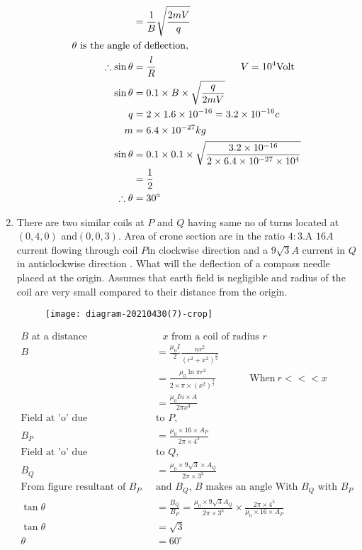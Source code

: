 \begin{enumerate}[ label=\color{ocre}\textbf{\arabic*.}]
\begin{answer}
\begin{align*}
		&=\frac{1}{B}\sqrt{\frac{2mV}{q}}\\
		\text{$ \theta $ is the angle }&\text{of deflection,}\\
		\therefore\sin\theta&=\frac{l}{R}\hspace{3cm}V=10^4\text{Volt}\\
		\sin\theta&=0.1\times B\times\sqrt{\frac{q}{2mV}}\\
		q&=2\times1.6\times10^{-16}=3.2\times10^{-16}c\\
		m&=6.4\times10^{-27}kg\\
		\sin\theta&=0.1\times0.1\times\sqrt{\frac{3.2\times10^{-16}}{2\times6.4\times10^{-27}\times10^4}}\\
		&=\frac{1}{2}\\
		\therefore\theta&=30^\circ
		\end{align*}
	\end{answer}
	\item There are two similar coils at $P$ and $Q$ having same no of turns located at $(0,4,0)$ and$(0,0,3)$. Area of crone section are in the ratio $4:3$.A $16 A$ current flowing through coil $P$in clockwise direction and a $9\sqrt{3} A$ current in $Q$ in anticlockwise direction . What will the deflection of a compass needle placed at the origin. Assumes that earth field is negligible and radius of the coil are very small compared to their distance from the origin.
	\begin{figure}[H]
		\begin{center}
			\texttt{[image: diagram-20210430(7)-crop]}
		\end{center}
	\end{figure}
	\begin{answer}
		\begin{align*}
		\text{$B$ at a distance}&\text{ $x$ from a coil of radius $r$}\\
		B&=\frac{\mu_0I}{2}\frac{nr^2}{(r^2+x^2)^\frac{3}{2}}\\
		&=\frac{\mu_0 \ln \pi r^2}{2\times\pi \times(x^2)^\frac{3}{2}}\hspace{1cm}\quad \text{When}\ r<<<x\\
		&=\frac{\mu_0In\times A}{2\pi x^3}\\
		\text{Field at 'o' \ due }&\text{to $P$,}\\
		B_P&=\frac{\mu_0\times16\times A_P}{2\pi\times4^3}\\
		\text{Field at 'o' \ due }&\text{to $Q$,}\\
		B_Q&=\frac{\mu_0\times9\sqrt{3}\times A_Q}{2\pi\times3^3}\\
		\text{From figure resultant of $B_P$ }&\text{and $B_Q$, $B$ makes an angle With \ $B_Q$\ with \ $B_P$}\\
		\tan\theta&=\frac{B_Q}{B_P}
		=\frac{\mu_0\times9\sqrt{3} A_Q}{2\pi\times3^3}\times\frac{2\pi\times4^3}{\mu_0\times16\times A_P}\\
		\tan\theta&=\sqrt{3}\\
		\theta&=60^\circ
		\end{align*}
	\end{answer}
\end{enumerate}
